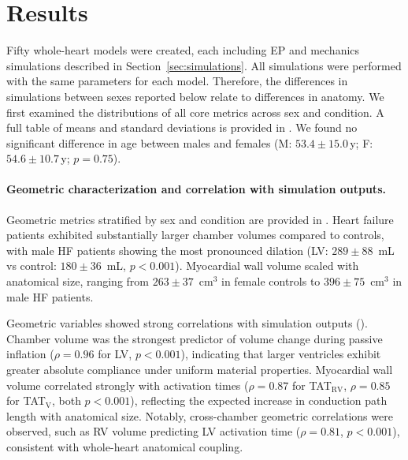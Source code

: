 \section{Results}
Fifty whole-heart models
were created, each including EP and mechanics simulations described in Section~\ref{sec:simulations}.
All simulations were performed with the same parameters for each model.
Therefore, the differences in simulations between sexes reported below relate to 
differences in anatomy.
We first examined the distributions of all core metrics across sex and condition.
A full table of means and standard deviations is provided in .
We found no significant difference in age between males and females
(M: $53.4\pm15.0$\,y; F: $54.6\pm10.7$\,y; $p=0.75$). 

\paragraph{Geometric characterization and correlation with simulation outputs.}
Geometric metrics stratified by sex and condition are provided in 
. 
Heart failure patients exhibited substantially larger chamber volumes 
compared to controls, with male HF patients showing the most pronounced dilation 
(LV: $289 \pm 88$~mL vs control: $180 \pm 36$~mL, $p<0.001$). Myocardial wall 
volume scaled with anatomical size, ranging from $263 \pm 37$~cm$^3$ 
in female controls to $396 \pm 75$~cm$^3$ in male HF patients.

Geometric variables showed strong correlations with simulation outputs 
().
Chamber volume was the strongest predictor of 
volume change during passive inflation ($\rho = 0.96$ for LV, $p < 0.001$), 
indicating that larger ventricles exhibit greater absolute compliance under 
uniform material properties. Myocardial wall volume correlated strongly with 
activation times ($\rho = 0.87$ for TAT$_{\mathrm{RV}}$, $\rho = 0.85$ for 
TAT$_{\mathrm{V}}$, both $p < 0.001$), reflecting the expected increase in 
conduction path length with anatomical size. Notably, cross-chamber geometric 
correlations were observed, such as RV volume predicting LV activation time 
($\rho = 0.81$, $p < 0.001$), consistent with whole-heart anatomical coupling.

